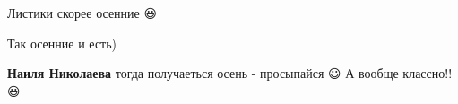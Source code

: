  
 
 
 
 

\qqSecCmt


Листики скорее осенние 😃

\begin{itemize} %

Так осенние и есть)

\textbf{Наиля Николаева} тогда получаеться осень - просыпайся 😃 А вообще классно!! 😃
\end{itemize} %
